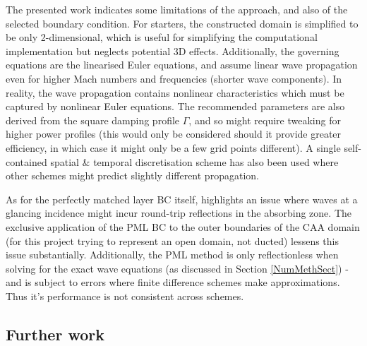 The presented work indicates some limitations of the approach, and also of the selected boundary condition. For starters, the constructed domain is simplified to be only 2-dimensional, which is useful for simplifying the computational implementation but neglects potential 3D effects. Additionally, the governing equations are the linearised Euler equations, and assume linear wave propagation even for higher Mach numbers and frequencies (shorter wave components). In reality, the wave propagation contains nonlinear characteristics which must be captured by nonlinear Euler equations. The recommended parameters are also derived from the square damping profile $\Gamma$, and so might require tweaking for higher power profiles (this would only be considered should it provide greater efficiency, in which case it might only be a few grid points different). A single self-contained spatial \& temporal discretisation scheme has also been used where other schemes might predict slightly different propagation.

As for the perfectly matched layer BC itself, \textcite{johnson2021notesonPML} highlights an issue where waves at a glancing incidence might incur round-trip reflections in the absorbing zone. The exclusive application of the PML BC to the outer boundaries of the CAA domain (for this project trying to represent an open domain, not ducted) lessens this issue substantially. Additionally, the PML method is only reflectionless when solving for the exact wave equations (as discussed in Section \ref{NumMethSect}) - and is subject to errors where finite difference schemes make approximations. Thus it's performance is not consistent across schemes.



\subsection{Further work}


